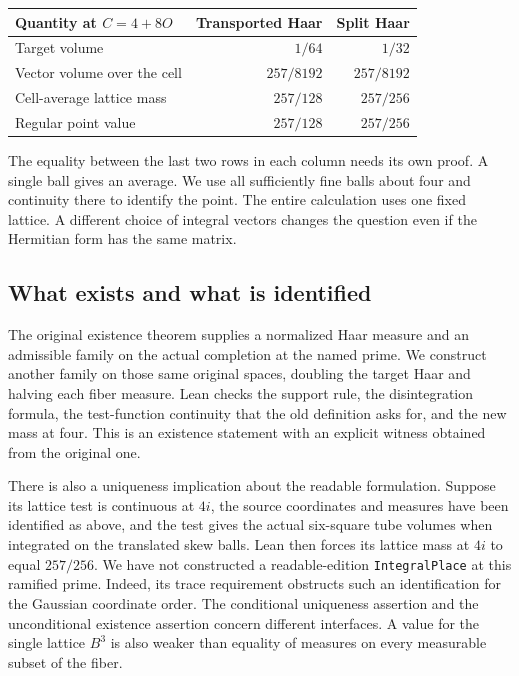 \documentclass[12pt,letterpaper]{article}
\newcommand{\id}[1]{{\small\nolinkurl{#1}}}
\begin{document}
\begin{center}\begin{tabular}{@{}lrr@{}}\toprule
Quantity at $C=4+8O$ & Transported Haar & Split Haar\\\midrule
Target volume & $1/64$ & $1/32$\\
Vector volume over the cell & $257/8192$ & $257/8192$\\
Cell-average lattice mass & $257/128$ & $257/256$\\
Regular point value & $257/128$ & $257/256$\\\bottomrule
\end{tabular}\end{center}
The equality between the last two rows in each column needs its own proof. A single ball gives an average. We use all sufficiently fine balls about four and continuity there to identify the point. The entire calculation uses one fixed lattice. A different choice of integral vectors changes the question even if the Hermitian form has the same matrix.

\subsection{What exists and what is identified}
The original existence theorem supplies a normalized Haar measure and an admissible family on the actual completion at the named prime. We construct another family on those same original spaces, doubling the target Haar and halving each fiber measure. Lean checks the support rule, the disintegration formula, the test-function continuity that the old definition asks for, and the new mass at four. This is an existence statement with an explicit witness obtained from the original one.

There is also a uniqueness implication about the readable formulation. Suppose its lattice test is continuous at $4i$, the source coordinates and measures have been identified as above, and the test gives the actual six-square tube volumes when integrated on the translated skew balls. Lean then forces its lattice mass at $4i$ to equal $257/256$. We have not constructed a readable-edition \id{IntegralPlace} at this ramified prime. Indeed, its trace requirement obstructs such an identification for the Gaussian coordinate order. The conditional uniqueness assertion and the unconditional existence assertion concern different interfaces. A value for the single lattice $B^3$ is also weaker than equality of measures on every measurable subset of the fiber.
\end{document}

